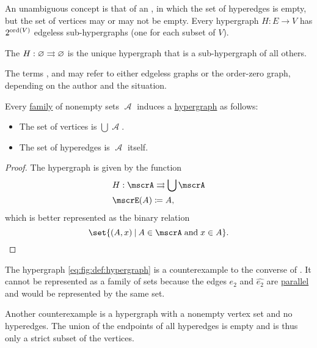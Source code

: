 \begin{definition}
\begin{thmenum}
    An unambiguous concept is that of an , in which the set of hyperedges is empty, but the set of vertices may or may not be empty. Every hypergraph \( H: E \to V \) has \( 2^{\operatorname{ord}(V)} \) edgeless sub-hypergraphs (one for each subset of \( V \)).

    The  \( H: \varnothing \rightrightarrows \varnothing \) is the unique hypergraph that is a sub-hypergraph of all others.

    The terms ,  and  may refer to either edgeless graphs or the order-zero graph, depending on the author and the situation.
  \end{thmenum}
\end{definition}

\begin{proposition}\label{thm:family_of_sets_induces_hypergraph}
  Every \hyperref[rem:family_of_sets]{family} of nonempty sets \( \mscrA \) induces a \hyperref[def:hypergraph]{hypergraph} as follows:
  \begin{itemize}
    \item The set of vertices is \( \bigcup \mscrA \).
    \item The set of hyperedges is \( \mscrA \) itself.
  \end{itemize}
\end{proposition}
\begin{proof}
  The hypergraph is given by the function
  \begin{equation*}
    \begin{aligned}
      &H: \mscrA \multto \bigcup \mscrA \\
      &\mscrE(A) \coloneqq A,
    \end{aligned}
  \end{equation*}
  which is better represented as the binary relation
  \begin{equation*}
    \set{ (A, x) \given A \in \mscrA \T{and} x \in A }.
  \end{equation*}
\end{proof}

\begin{example}\label{ex:hypergraphs_not_induced_by_family}
  The hypergraph \eqref{eq:fig:def:hypergraph} is a counterexample to the converse of . It cannot be represented as a family of sets because the edges \( e_2 \) and \( \widehat{e_2} \) are \hyperref[def:hypergraph/parallel_hyperedges]{parallel} and would be represented by the same set.

  Another counterexample is a hypergraph with a nonempty vertex set and no hyperedges. The union of the endpoints of all hyperedges is empty and is thus only a strict subset of the vertices.
\end{example}

